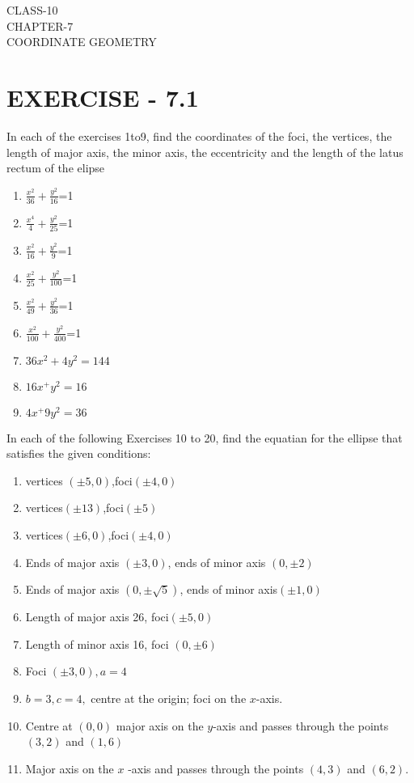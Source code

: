 \documentclass[12pt]{article}
\begin{document}
\begin{center}
\textbf\large{CLASS-10\\CHAPTER-7 \\ COORDINATE GEOMETRY}
\end{center}

\section*{EXERCISE - 7.1}
In each of the exercises 1to9, find the coordinates of the foci, the vertices, the length of major axis, the minor axis, the eccentricity and the length of the latus rectum of the elipse
\begin{enumerate} 
\item $\frac{x^2}{36}+\frac{y^2}{16}$=1
\item $\frac{x^4}{4}+\frac{y^2}{25}$=1
\item $\frac{x^2}{16}+\frac{y^2}{9}$=1
\item $\frac{x^2}{25}+\frac{y^2}{100}$=1
\item $\frac{x^2}{49}+\frac{y^2}{36}$=1
\item $\frac{x^2}{100}+\frac{y^2}{400}$=1
\item $36x^2+4y^2=144$
\item $16x^+y^2=16$
\item $4x^+9y^2=36$
\end{enumerate}
In each of the following  Exercises 10 to 20, find the equatian for the ellipse that satisfies the given conditions:
\begin{enumerate}[resume]
\item vertices $(\pm5,0)$,foci$(\pm4,0)$
\item vertices$(\pm13)$,foci$(\pm5)$
\item vertices$(\pm6,0)$,foci$(\pm4,0)$
\item Ends of major axis $(\pm3,0)$, ends of minor axis $(0,\pm2)$
\item Ends of major axis $(0,\pm\sqrt{5})$, ends of minor axis$(\pm1,0)$
\item Length of major axis 26, foci$(\pm5,0)$
\item Length of minor axis 16, foci $(0,\pm6)$
\item Foci $(\pm3,0), a=4$
\item $b=3, c=4,$ centre at the origin; foci on the $x$-axis.
\item  Centre at $(0,0)$ major axis on the $y$-axis and passes through the points $(3,2)$ and $(1,6)$
\item Major axis on the $x$ -axis and passes through the points $(4,3)$ and $(6,2)$.
\end{enumerate}
\end{document}
